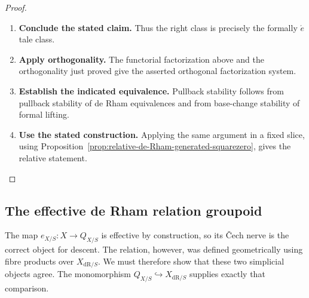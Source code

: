\begin{proof}
\begin{enumerate}[label=\textup{(\arabic*)}]
    Lemma~\ref{lem:local-map-orthogonality} then makes it right orthogonal to every
    de Rham equivalence.
    \item \textbf{Conclude the stated claim.}
    Thus the right class is precisely the formally
    \(\acute{e}\)tale class.
    \item \textbf{Apply orthogonality.}
    The functorial factorization above and the
    orthogonality just proved give the asserted orthogonal factorization system.
    \item \textbf{Establish the indicated equivalence.}
    Pullback stability follows from pullback stability of de Rham equivalences and
    from base-change stability of formal lifting.
    \item \textbf{Use the stated construction.}
    Applying the same argument in a
    fixed slice, using
    Proposition~\ref{prop:relative-de-Rham-generated-squarezero}, gives the relative
    statement.
\end{enumerate}
\end{proof}

\subsection{The effective de Rham relation groupoid}
\label{sec:effective-relation}

The map \(e_{X/S}:X\to Q_{X/S}\) is effective by construction, so its
\v{C}ech nerve is the correct object for descent. The relation, however, was
defined geometrically using fibre products over \(X_{\mathrm{dR}/S}\). We
must therefore show that these two simplicial objects agree. The
monomorphism \(Q_{X/S}\hookrightarrow X_{\mathrm{dR}/S}\) supplies exactly
that comparison.

